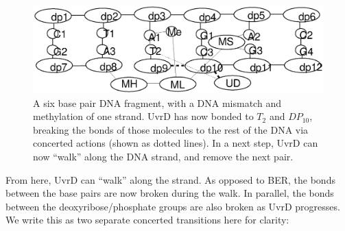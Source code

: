 \begin{figure}[h!]
  \centering
    \includegraphics[width=1.0\textwidth]{mmr/state3}
  \caption[A six base pair DNA fragment.]{A six base pair DNA fragment, with a DNA mismatch and methylation of one strand. UvrD has now bonded to $T_2$ and $DP_{10}$, breaking the bonds of those molecules to the rest of the DNA via concerted actions (shown as dotted lines). In a next step, UvrD can now ``walk'' along the DNA strand, and remove the next pair.}
  \label{fig:state3}
\end{figure}

From here, UvrD can ``walk'' along the strand. As opposed to BER, the bonds between the base pairs are now broken during the walk. In parallel, the bonds between the deoxyribose/phosphate groups are also broken as UvrD progresses. We write this as two separate concerted transitions here for clarity:

